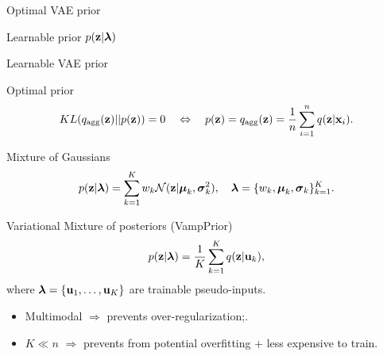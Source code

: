 \begin{frame}{Optimal VAE prior}
\begin{minipage}[t]{0.5\columnwidth}
\begin{block}{Learnable prior $p(\mathbf{z} | \boldsymbol{\lambda})$}
\begin{figure}[h]
			\end{figure}
		\end{block}
	\end{minipage}
\end{frame}
\begin{frame}{Learnable VAE prior}
	\begin{block}{Optimal prior}
		\vspace{-0.7cm}
		\[
			KL(q_{\text{agg}}(\mathbf{z}) || p(\mathbf{z})) = 0 \quad \Leftrightarrow \quad p (\mathbf{z}) = q_{\text{agg}}(\mathbf{z}) = \frac{1}{n} \sum_{i=1}^n q(\mathbf{z} | \mathbf{x}_i).
		\]
		\vspace{-0.6cm}
	\end{block}
	\begin{block}{Mixture of Gaussians}
		\vspace{-0.3cm}
		\[
			p(\mathbf{z} | \boldsymbol{\lambda}) = \sum_{k=1}^K w_k \mathcal{N}(\mathbf{z} | \boldsymbol{\mu}_k, \boldsymbol{\sigma}_k^2), \quad \boldsymbol{\lambda} = \{w_k, \boldsymbol{\mu}_k, \boldsymbol{\sigma}_k\}_{k=1}^K.
		\]
		\vspace{-0.5cm}
	\end{block}
	\begin{block}{Variational Mixture of posteriors (VampPrior)}
		\vspace{-0.3cm}
		\[
		p(\mathbf{z} | \boldsymbol{\lambda}) = \frac{1}{K} \sum_{k=1}^K q(\mathbf{z} | \mathbf{u}_k),
		\]
		where $\boldsymbol{\lambda} = \{\mathbf{u}_1, \dots, \mathbf{u}_K\}$ are trainable pseudo-inputs.
	\end{block}
	\begin{itemize}
		\item Multimodal $\Rightarrow$ prevents over-regularization;.
		\item $K \ll n$ $\Rightarrow$ prevents from potential overfitting + less expensive to train.
	\end{itemize}
\end{frame}
